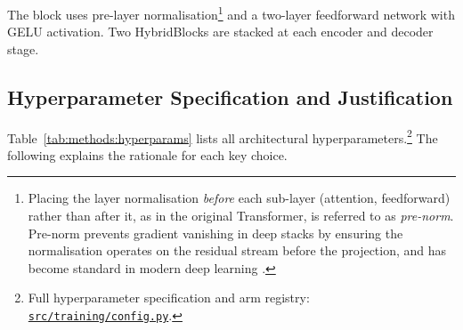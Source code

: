 \documentclass[12pt, a4paper, twoside, openright]{book}
\begin{document}
The block uses pre-layer normalisation\footnote{Placing the layer normalisation \emph{before} each sub-layer (attention, feedforward) rather than after it, as in the original Transformer, is referred to as \emph{pre-norm}. Pre-norm prevents gradient vanishing in deep stacks by ensuring the normalisation operates on the residual stream before the projection, and has become standard in modern deep learning \cite{xiong_layer_2020}.} and a two-layer feedforward network with GELU activation. Two HybridBlocks are stacked at each encoder and decoder stage.



\subsection{Hyperparameter Specification and Justification}
\label{sec:methods:architecture:hyperparams}

Table~\ref{tab:methods:hyperparams} lists all architectural hyperparameters.\footnote{Full hyperparameter specification and arm registry: \href{https://github.com/teklesam/ppva_hformer_codebase/blob/main/src/training/config.py}{\texttt{src/training/config.py}}.} The following explains the rationale for each key choice.
\end{document}
